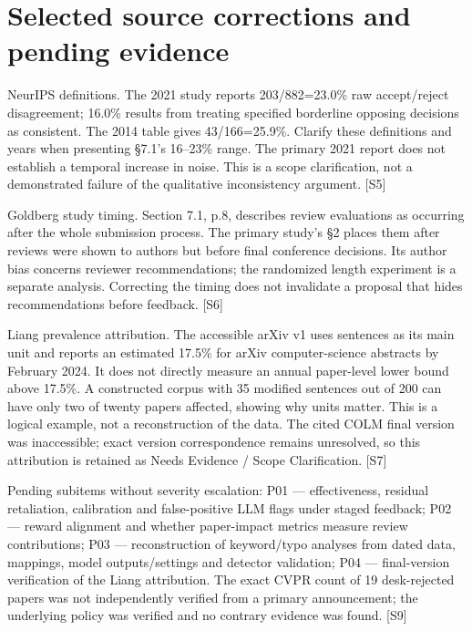 \documentclass[10pt]{article}
\begin{document}
\section*{Selected source corrections and pending evidence}
NeurIPS definitions. The 2021 study reports 203/882=23.0\% raw accept/reject disagreement; 16.0\% results from treating specified borderline opposing decisions as consistent. The 2014 table gives 43/166=25.9\%. Clarify these definitions and years when presenting §7.1’s 16–23\% range. The primary 2021 report does not establish a temporal increase in noise. This is a scope clarification, not a demonstrated failure of the qualitative inconsistency argument. [S5]\par
Goldberg study timing. Section 7.1, p.8, describes review evaluations as occurring after the whole submission process. The primary study’s §2 places them after reviews were shown to authors but before final conference decisions. Its author bias concerns reviewer recommendations; the randomized length experiment is a separate analysis. Correcting the timing does not invalidate a proposal that hides recommendations before feedback. [S6]\par
Liang prevalence attribution. The accessible arXiv v1 uses sentences as its main unit and reports an estimated 17.5\% for arXiv computer-science abstracts by February 2024. It does not directly measure an annual paper-level lower bound above 17.5\%. A constructed corpus with 35 modified sentences out of 200 can have only two of twenty papers affected, showing why units matter. This is a logical example, not a reconstruction of the data. The cited COLM final version was inaccessible; exact version correspondence remains unresolved, so this attribution is retained as Needs Evidence / Scope Clarification. [S7]\par
Pending subitems without severity escalation: P01 — effectiveness, residual retaliation, calibration and false-positive LLM flags under staged feedback; P02 — reward alignment and whether paper-impact metrics measure review contributions; P03 — reconstruction of keyword/typo analyses from dated data, mappings, model outputs/settings and detector validation; P04 — final-version verification of the Liang attribution. The exact CVPR count of 19 desk-rejected papers was not independently verified from a primary announcement; the underlying policy was verified and no contrary evidence was found. [S9]\par
\end{document}
